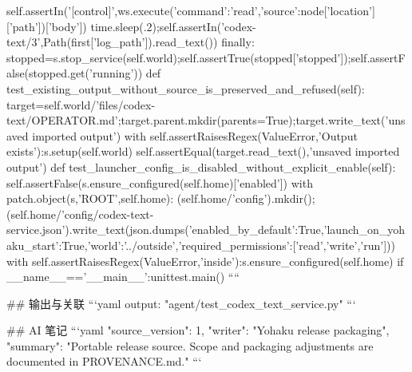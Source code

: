    self.assertIn('[control]\ndraft\n[/control]',ws.execute({'command':'read','source':node['location']['path']})['body'])
   time.sleep(.2);self.assertIn('codex-text/3',Path(first['log_path']).read_text())
  finally:
   stopped=s.stop_service(self.world);self.assertTrue(stopped['stopped']);self.assertFalse(stopped.get('running'))
 def test_existing_output_without_source_is_preserved_and_refused(self):
  target=self.world/'files/codex-text/OPERATOR.md';target.parent.mkdir(parents=True);target.write_text('unsaved imported output')
  with self.assertRaisesRegex(ValueError,'Output exists'):s.setup(self.world)
  self.assertEqual(target.read_text(),'unsaved imported output')
 def test_launcher_config_is_disabled_without_explicit_enable(self):
  self.assertFalse(s.ensure_configured(self.home)['enabled'])
  with patch.object(s,'ROOT',self.home):
   (self.home/'config').mkdir();(self.home/'config/codex-text-service.json').write_text(json.dumps({'enabled_by_default':True,'launch_on_yohaku_start':True,'world':'../outside','required_permissions':['read','write','run']}))
   with self.assertRaisesRegex(ValueError,'inside'):s.ensure_configured(self.home)
if __name__=='__main__':unittest.main()
````

## 输出与关联
```yaml
output: "agent/test_codex_text_service.py"
```

## AI 笔记
```yaml
{"source_version": 1, "writer": "Yohaku release packaging", "summary": "Portable release source. Scope and packaging adjustments are documented in PROVENANCE.md."}
```
